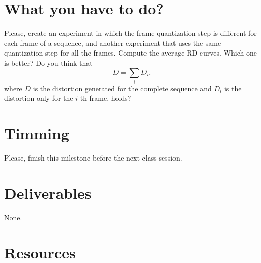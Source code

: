 \section{What you have to do?}

Please, create an experiment in which the frame quantization step is
different for each frame of a sequence, and another experiment that
uses the same quantization step for all the frames. Compute the
average RD curves. Which one is better? Do you think that
\begin{equation*}
  D = \sum_i D_i,
\end{equation*}
where $D$ is the distortion generated for the complete sequence and
$D_i$ is the distortion only for the $i$-th frame, holds?


\section{Timming}

Please, finish this milestone before the next class session.

\section{Deliverables}

None.

\section{Resources}

\renewcommand{\addcontentsline}[3]{}%

